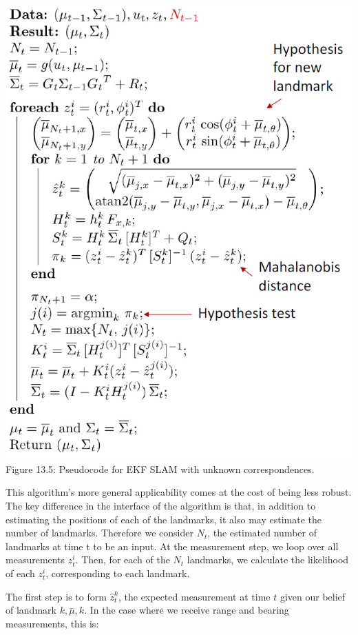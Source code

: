\begin{center}
\includegraphics[scale = 0.6]{ekf_slam.png}\\
Figure 13.5: Pseudocode for EKF SLAM with unknown correspondences.
\end{center}


This algorithm’s more general applicability comes at the cost of being less robust.
The key difference in the interface of the algorithm is that, in addition to estimating the positions of each of the landmarks, it also may estimate the number of landmarks. Therefore we consider $N_t$, the estimated number of landmarks at time t to be an input. At the measurement step, we loop over all measurements $z_{t}^i$. Then, for each of the $N_t$ landmarks, we calculate the likelihood of each $z_t^i$, corresponding to each landmark.


The first step is to form $\hat{z}_{t}^{k}$, the expected measurement at time $t$ given our belief of landmark $k, \bar{\mu},  k$. In the case where we receive range and bearing measurements, this is:

